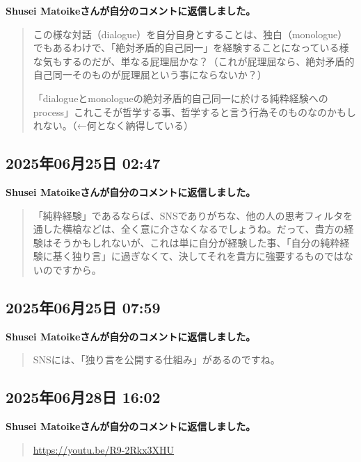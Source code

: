 \textbf{Shusei Matoikeさんが自分のコメントに返信しました。}

\begin{quote}
この様な対話（dialogue）を自分自身とすることは、独白（monologue）でもあるわけで、「絶対矛盾的自己同一」を経験することになっている様な気もするのだが、単なる屁理屈かな？（これが屁理屈なら、絶対矛盾的自己同一そのものが屁理屈という事にならないか？）

「dialogueとmonologueの絶対矛盾的自己同一に於ける純粋経験へのprocess」これこそが哲学する事、哲学すると言う行為そのものなのかもしれない。（←何となく納得している）
\end{quote}

\subsection*{2025年06月25日 02:47}

\textbf{Shusei Matoikeさんが自分のコメントに返信しました。}

\begin{quote}
「純粋経験」であるならば、SNSでありがちな、他の人の思考フィルタを通した横槍などは、全く意に介さなくなるでしょうね。だって、貴方の経験はそうかもしれないが、これは単に自分が経験した事、「自分の純粋経験に基く独り言」に過ぎなくて、決してそれを貴方に強要するものではないのですから。
\end{quote}

\subsection*{2025年06月25日 07:59}

\textbf{Shusei Matoikeさんが自分のコメントに返信しました。}

\begin{quote}
SNSには、「独り言を公開する仕組み」があるのですね。
\end{quote}

\subsection*{2025年06月28日 16:02}

\textbf{Shusei Matoikeさんが自分のコメントに返信しました。}

\begin{quote}
\url{https://youtu.be/R9-2Rkx3XHU}
\end{quote}

